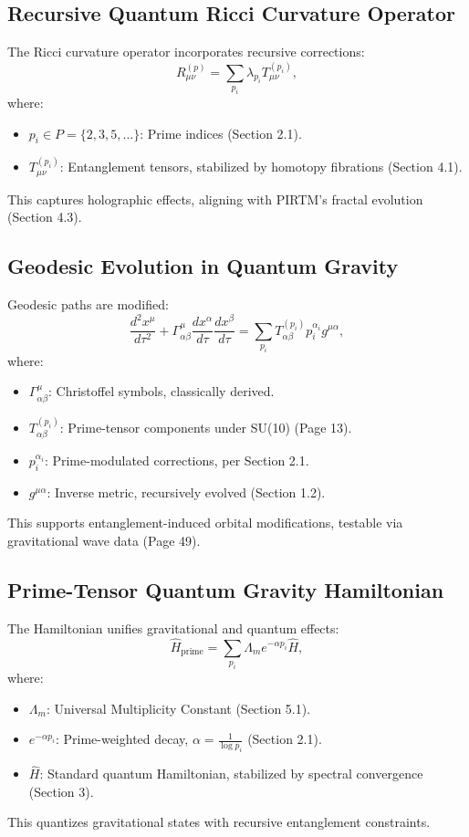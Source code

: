 \documentclass{article}
\theoremstyle{plain}
\begin{document}
\subsection{Recursive Quantum Ricci Curvature Operator}
The Ricci curvature operator incorporates recursive corrections:
\begin{equation}
R_{\mu\nu}^{(p)} = \sum_{p_i} \lambda_{p_i} T_{\mu\nu}^{(p_i)},
\end{equation}
where:
\begin{itemize}
    \item \( p_i \in P = \{2, 3, 5, \dots\} \): Prime indices (Section 2.1).
    \item \( T_{\mu\nu}^{(p_i)} \): Entanglement tensors, stabilized by homotopy fibrations (Section 4.1).
\end{itemize}
This captures holographic effects, aligning with PIRTM’s fractal evolution (Section 4.3).

\subsection{Geodesic Evolution in Quantum Gravity}
Geodesic paths are modified:
\begin{equation}
\frac{d^2 x^\mu}{d\tau^2} + \Gamma^\mu_{\alpha \beta} \frac{dx^\alpha}{d\tau} \frac{dx^\beta}{d\tau} = \sum_{p_i} T_{\alpha \beta}^{(p_i)} p_i^{\alpha_i} g^{\mu\alpha},
\end{equation}
where:
\begin{itemize}
    \item \( \Gamma^\mu_{\alpha \beta} \): Christoffel symbols, classically derived.
    \item \( T_{\alpha \beta}^{(p_i)} \): Prime-tensor components under SU(10) (Page 13).
    \item \( p_i^{\alpha_i} \): Prime-modulated corrections, per Section 2.1.
    \item \( g^{\mu\alpha} \): Inverse metric, recursively evolved (Section 1.2).
\end{itemize}
This supports entanglement-induced orbital modifications, testable via gravitational wave data (Page 49).

\subsection{Prime-Tensor Quantum Gravity Hamiltonian}
The Hamiltonian unifies gravitational and quantum effects:
\begin{equation}
\hat{H}_{\text{prime}} = \sum_{p_i} \Lambda_m e^{-\alpha p_i} \hat{H},
\end{equation}
where:
\begin{itemize}
    \item \( \Lambda_m \): Universal Multiplicity Constant (Section 5.1).
    \item \( e^{-\alpha p_i} \): Prime-weighted decay, \( \alpha = \frac{1}{\log p_i} \) (Section 2.1).
    \item \( \hat{H} \): Standard quantum Hamiltonian, stabilized by spectral convergence (Section 3).
\end{itemize}
This quantizes gravitational states with recursive entanglement constraints.
\end{document}
